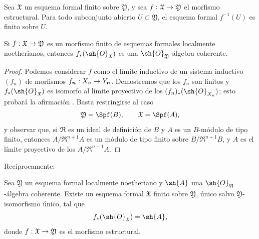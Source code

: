 \documentclass[oneside]{amsart}
\makeatletter
\newcommand{\ega@arrow}[2]{\mathchoice{#1}{#2}{#2}{#2}}
\renewcommand{\to}{\ega@arrow{\longrightarrow}{\rightarrow}}
\let\EGAOriginalLabel\label
\renewcommand{\label}[1]{\phantomsection\EGAOriginalLabel{#1}}
\makeatother
\begin{document}
\begin{corollary}[4.8.5]
\label{III.4.8.5}
Sea $\mathfrak{X}$ un esquema formal finito sobre
$\mathfrak{Y}$, y sea
$f:\mathfrak{X}\to\mathfrak{Y}$ el morfismo estructural. Para
todo subconjunto abierto $U\subset\mathfrak{Y}$, el esquema formal
$f^{-1}(U)$ es finito sobre $U$.
\end{corollary}

\begin{proposition}[4.8.6]
\label{III.4.8.6}
Si $f:\mathfrak{X}\to\mathfrak{Y}$ es un morfismo finito de esquemas
formales localmente noetherianos, entonces
$f_*(\sh{O}_{\mathfrak{X}})$ es una
$\sh{O}_{\mathfrak{Y}}$-álgebra coherente.
\end{proposition}

\begin{proof}
Podemos considerar $f$ como el límite inductivo de un sistema inductivo
$(f_n)$ de morfismos $f_{\boldsymbol n}:X_n\to Y_{\boldsymbol n}$. Demostremos que los
$f_n$ son finitos y $f_*(\sh{O}_{\mathfrak{X}})$ es
isomorfo al límite proyectivo de los
$(f_n)_*(\sh{O}_{X_n})$; esto probará la afirmación
. Basta restringirse al caso
\[
  \mathfrak{Y}=\Spf(B),\qquad \mathfrak{X}=\Spf(A),
\]
y observar que, si $\mathfrak{R}$ es un ideal de definición
de $B$ y $A$ es un $B$-módulo de tipo finito, entonces
$A/\mathfrak{R}^{n+1}A$ es un módulo de tipo finito sobre
$B/\mathfrak{R}^{n+1}B$, y $A$ es el límite proyectivo de los
$A/\mathfrak{R}^{n+1}A$.
\end{proof}

Recíprocamente:

\begin{proposition}[4.8.7]
\label{III.4.8.7}
Sea $\mathfrak{Y}$ un esquema formal localmente noetheriano y
$\sh{A}$ una $\sh{O}_{\mathfrak{Y}}$-álgebra coherente. Existe
un esquema formal $\mathfrak{X}$ finito sobre $\mathfrak{Y}$,
único salvo $\mathfrak{Y}$-isomorfismo único, tal que
\[
  f_*(\sh{O}_{\mathfrak{X}})=\sh{A},
\]
donde $f:\mathfrak{X}\to\mathfrak{Y}$ es el morfismo estructural.
\end{proposition}
\end{document}
